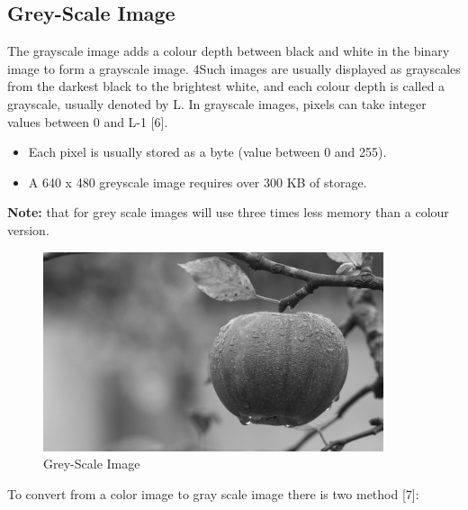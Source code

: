 \subsection{Grey-Scale Image}
The grayscale image adds a colour depth between black and white in the binary image to form a grayscale image.
4Such images are usually displayed as grayscales from the darkest black to the brightest white, and each colour
depth is called a grayscale, usually denoted by L. In grayscale images, pixels can take integer values between 0 and L-1 [6].

        \begin{itemize}
                \item Each pixel is usually stored as a byte (value between 0 and 255).
                \item A 640 x 480 greyscale image requires over 300 KB of storage.
        \end{itemize}
\textbf{Note:}  that for grey scale images will use three times less memory than a colour version.

        \begin{figure}[h]
                \centering
                \includegraphics[width=10cm]{chapiter1/figures/grey-scal.png}
                \setlength{\fboxrule}{2pt}
                \caption{Grey-Scale Image}
        \end{figure}

To convert from a color image to gray scale image there is two method [7]:


